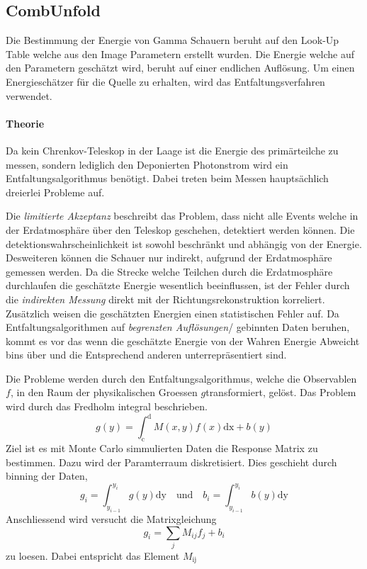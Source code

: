 \subsection{CombUnfold}%
\label{sub:combunfold}
Die Bestimmung der Energie von Gamma Schauern beruht auf den Look-Up Table
welche aus den Image Parametern erstellt wurden. 
Die Energie welche auf den Parametern geschätzt wird, beruht auf einer 
endlichen Auflösung.
Um einen Energieschätzer für die Quelle zu erhalten, 
wird das Entfaltungsverfahren verwendet.

\paragraph{Theorie}%
\label{par:theorie}
Da kein Chrenkov-Teleskop in der Laage ist die Energie 
des primärteilche zu messen,
sondern lediglich den Deponierten Photonstrom wird ein Entfaltungsalgorithmus
benötigt.
Dabei treten beim Messen hauptsächlich dreierlei Probleme auf.

Die \textit{limitierte Akzeptanz} beschreibt das Problem, 
dass nicht alle Events welche in der Erdatmosphäre über den Teleskop geschehen,
detektiert werden können. 
Die detektionswahrscheinlichkeit ist sowohl beschränkt 
und abhängig von der Energie.
Desweiteren können die Schauer nur indirekt, 
aufgrund der Erdatmosphäre gemessen werden.
Da die Strecke welche Teilchen durch die Erdatmosphäre durchlaufen die
geschätzte Energie wesentlich beeinflussen,
ist der Fehler durch die \textit{indirekten Messung} direkt mit der
Richtungsrekonstruktion korreliert.
Zusätzlich weisen die geschätzten Energien einen statistischen Fehler auf. 
Da Entfaltungsalgorithmen auf \textit{begrenzten Auflösungen}/ gebinnten Daten
beruhen, kommt es vor das wenn die geschätzte Energie von der Wahren Energie
Abweicht bins über und die Entsprechend anderen unterrepräsentiert sind.

Die Probleme werden durch den Entfaltungsalgorithmus,
welche die Observablen $f$,
in den Raum der physikalischen Groessen $g$transformiert,
gelöst.
Das Problem wird durch das Fredholm integral beschrieben.
\begin{equation}
	g(y) = \int_\text{c}^\text{d} M(x,y) f(x) \text{dx} + b(y)
\end{equation}
Ziel ist es mit Monte Carlo simmulierten Daten die Response Matrix zu bestimmen.
Dazu wird der Paramterraum diskretisiert.
Dies geschieht durch binning der Daten,
\begin{equation}
	g_i = \int_{y_{i-1}}^{y_i} g(y) \text{dy} \quad \text{und} \quad
	b_i = \int_{y_{i-1}}^{y_i} b(y) \text{dy}
\end{equation}
Anschliessend wird versucht die Matrixgleichung 
\begin{equation}
	g_i = \sum_j M_{ij} f_j + b_i
\end{equation}
zu loesen.
Dabei entspricht das Element $M_\text{ij}$


